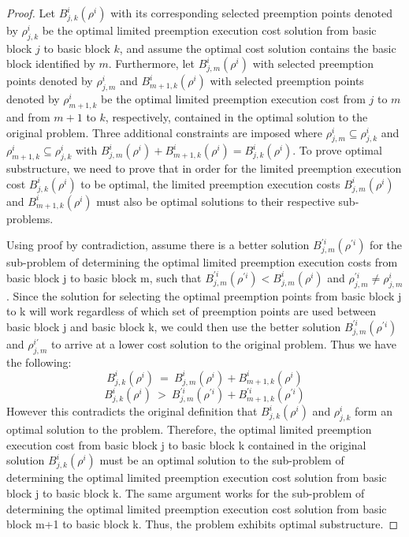 \begin{proof}
Let $B_{j,k}^{i}(\rho^{i})$ with its corresponding selected preemption points denoted by $\rho_{j,k}^{i}$ be the optimal limited preemption execution cost solution from basic block $j$ to basic block $k$, and assume the optimal cost solution contains the basic block identified by $m$. Furthermore, let $B_{j,m}^{i}(\rho^{i})$ with selected preemption points denoted by $\rho_{j,m}^{i}$ and $B_{m+1,k}^{i}(\rho^{i})$ with selected preemption points denoted by $\rho_{m+1,k}^{i}$ be the optimal limited preemption execution cost from $j$ to $m$ and from $m+1$ to $k$, respectively, contained in the optimal solution to the original problem. Three additional constraints are imposed where $\rho_{j,m}^{i} \subseteq \rho_{j,k}^{i}$ and $\rho_{m+1,k}^{i} \subseteq  \rho_{j,k}^{i}$ with $B_{j,m}^{i}(\rho^{i}) + B_{m+1,k}^{i}(\rho^{i}) = B_{j,k}^{i}(\rho^{i})$. To prove optimal substructure, we need to prove that in order for the limited preemption execution cost $B_{j,k}^{i}(\rho^{i})$ to be optimal, the limited preemption execution costs $B_{j,m}^{i}(\rho^{i})$ and $B_{m+1,k}^{i}(\rho^{i})$ must also be optimal solutions to their respective sub-problems.

Using proof by contradiction, assume there is a better solution $B_{j,m}^{'i}(\rho^{'i})$ for the sub-problem of determining the optimal limited preemption execution costs from basic block j to basic block m, such that $B_{j,m}^{'i}(\rho^{'i}) < B_{j,m}^{i}(\rho^{i})$ and $\rho_{j,m}^{'i} \neq \rho_{j,m}^{i}$. Since the solution for selecting the optimal preemption points from basic block j to k will work regardless of which set of preemption points are used between basic block j and basic block k, we could then use the better solution  $B_{j,m}^{'i}(\rho^{'i})$ and $\rho_{j,m}^{i'}$ to arrive at a lower cost solution to the original problem. Thus we have the following:
\begin{equation}\label{eqn:pcost-bb-1}
B_{j,k}^{i}(\rho^{i})\ =\ B_{j,m}^{i}(\rho^{i}) + B_{m+1,k}^{i}(\rho^{i})
\end{equation}
\begin{equation}\label{eqn:pcost-bb-2}
B_{j,k}^{i}(\rho^{i})\ >\ B_{j,m}^{'i}(\rho^{'i}) + B_{m+1,k}^{'i}(\rho^{'i})
\end{equation}
\noindent
However this contradicts the original definition that $B_{j,k}^{i}(\rho^{i})$ and $\rho_{j,k}^{i}$ form an optimal solution to the problem. Therefore, the optimal limited preemption execution cost from basic block j to basic block k contained in the original solution $B_{j,k}^{i}(\rho^{i})$ must be an optimal solution to the sub-problem of determining the optimal limited preemption execution cost solution from basic block j to basic block k. The same argument works for the sub-problem of determining the optimal limited preemption execution cost solution from basic block m+1 to basic block k. Thus, the problem exhibits optimal substructure.
\end{proof}
